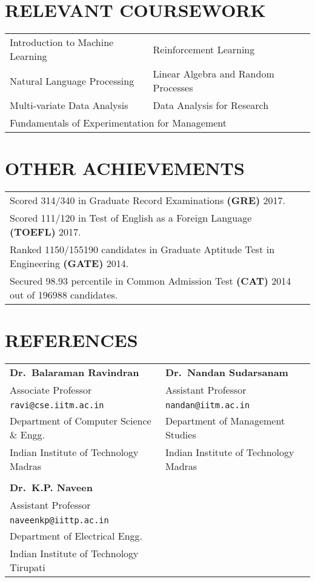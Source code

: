 \documentclass[margin,11pt]{res}
\begin{document}
\begin{resume}
\section{RELEVANT COURSEWORK}
\begin{tabular}{ll}
Introduction to Machine Learning & Reinforcement Learning  \\
Natural Language Processing & Linear Algebra and Random Processes \\
Multi-variate Data Analysis & Data Analysis for Research \\
\multicolumn{2}{l}{Fundamentals of Experimentation for Management}
\end{tabular}

\section{OTHER ACHIEVEMENTS}
\begin{tabular}{p{12cm}p{80cm}}
Scored 314/340 in Graduate Record Examinations \textbf{(GRE)} 2017.\\
Scored 111/120 in Test of English as a Foreign Language \textbf{(TOEFL)} 2017.\\
Ranked 1150/155190 candidates in Graduate Aptitude Test in Engineering \textbf{(GATE)} 2014. \\
Secured 98.93 percentile in Common Admission Test \textbf{(CAT)} 2014 out of 196988 candidates.
\end{tabular}

\section{REFERENCES}
\begin{tabular}{lll}
\textbf{Dr.~Balaraman Ravindran} & \textbf{Dr.~Nandan Sudarsanam} \\
Associate Professor & Assistant Professor\\
\texttt{ravi@cse.iitm.ac.in} & \texttt{nandan@iitm.ac.in}\\
Department of Computer Science \& Engg. & Department of Management Studies\\ 
Indian Institute of Technology Madras & Indian Institute of Technology Madras\\
\\
\textbf{Dr.~K.P. Naveen} \\
Assistant Professor\\
\texttt{naveenkp@iittp.ac.in}\\
Department of Electrical Engg.\\ 
Indian Institute of Technology Tirupati

\end{tabular}



\end{resume}
\end{document}
